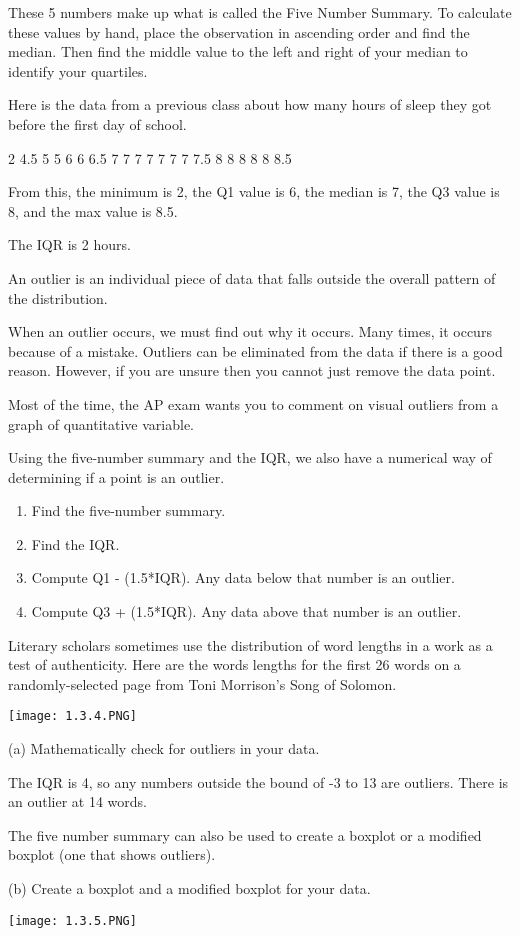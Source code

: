 \documentclass[../stats.tex]{subfiles}
\begin{document}
These 5 numbers make up what is called the Five Number Summary. To calculate these values by hand, place the observation in ascending order and find the median. Then find the middle value to the left and right of your median to identify your quartiles.

\begin{example}
    Here is the data from a previous class about how many hours of sleep they got before the first day of school.
    \begin{center}
        2 4.5 5 5 6 6 6.5 7 7 7 7 7 7 7 7.5 8 8 8 8 8 8.5
    \end{center}

    From this, the minimum is 2, the Q1 value is 6, the median is 7, the Q3 value is 8, and the max value is 8.5.

    The IQR is 2 hours.
\end{example}

An outlier is an individual piece of data that falls outside the overall pattern of the distribution.

When an outlier occurs, we must find out why it occurs. Many times, it occurs because of a mistake. Outliers can be eliminated from the data if there is a good reason. However, if you are unsure then you cannot just remove the data point.

Most of the time, the AP exam wants you to comment on visual outliers from a graph of quantitative variable.

Using the five-number summary and the IQR, we also have a numerical way of determining if a point is an outlier.
\begin{enumerate}
    \item Find the five-number summary.
    \item Find the IQR.
    \item Compute Q1 - (1.5*IQR). Any data below that number is an outlier.
    \item Compute Q3 + (1.5*IQR). Any data above that number is an outlier.
\end{enumerate}

\begin{example}
    Literary scholars sometimes use the distribution of word lengths in a work as a test of authenticity. Here are the words lengths for the first 26 words on a randomly-selected page from Toni Morrison's Song of Solomon.
    \begin{center}
        \texttt{[image: 1.3.4.PNG]}
    \end{center}

    (a) Mathematically check for outliers in your data.

    The IQR is 4, so any numbers outside the bound of -3 to 13 are outliers. There is an outlier at 14 words.

    The five number summary can also be used to create a boxplot or a modified boxplot (one that shows outliers).

    (b) Create a boxplot and a modified boxplot for your data.
    \begin{center}
        \texttt{[image: 1.3.5.PNG]}
    \end{center}
\end{example}
\end{document}
